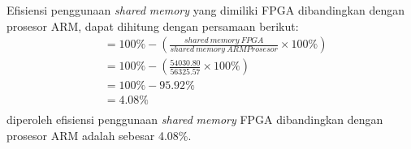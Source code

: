 Efisiensi penggunaan \textit{shared} \textit{memory} yang dimiliki FPGA dibandingkan dengan prosesor ARM, dapat dihitung dengan persamaan berikut:
\begin{equation*}
    \begin{split}
& = 100\% - \left( \frac{shared\ memory\ FPGA}{shared\ memory\ ARM Prosesor} \times 100\% \right) \\
& = 100\% - \left( \frac{54030.80}{56325.57} \times 100\% \right) \\
& = 100\% - 95.92\% \\
& = 4.08\% \\
    \end{split}
\end{equation*}
diperoleh efisiensi penggunaan \textit{shared} \textit{memory} FPGA dibandingkan dengan prosesor ARM adalah sebesar 4.08\%.

